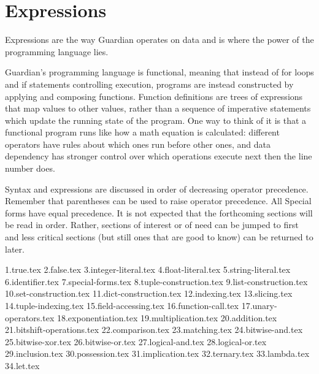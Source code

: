 
\section{Expressions}
{
	Expressions are the way Guardian operates on data and is where the power
	of the programming language lies.
	
	Guardian's programming language is functional, meaning that instead of
	for loops and if statements controlling execution, programs are
	instead constructed by applying and composing functions. Function
	definitions are trees of expressions that map values to other values,
	rather than a sequence of imperative statements which update
	the running state of the program. One way to think of it is that
	a functional program runs like how a math equation is
	calculated: different operators have rules about which ones run before
	other ones, and data dependency has stronger control over which
	operations execute next then the line number does.
	
	Syntax and expressions are discussed in order of decreasing operator
	precedence. Remember that parentheses can be used to raise operator
	precedence. All Special forms have equal precedence.
	It is not expected that the forthcoming sections will be read
	in order. Rather, sections of interest or of need can be jumped to first
	and less critical sections (but still ones that are good to know) can be
	returned to later.
	
	{1.true.tex}
	{2.false.tex}
	{3.integer-literal.tex}
	{4.float-literal.tex}
	{5.string-literal.tex}
	{6.identifier.tex}
	{7.special-forms.tex}
	{8.tuple-construction.tex}
	{9.list-construction.tex}
	{10.set-construction.tex}
	{11.dict-construction.tex}
	{12.indexing.tex}
	{13.slicing.tex}
	{14.tuple-indexing.tex}
	{15.field-accessing.tex}
	{16.function-call.tex}
	{17.unary-operators.tex}
	{18.exponentiation.tex}
	{19.multiplication.tex}
	{20.addition.tex}
	{21.bitshift-operations.tex}
	{22.comparison.tex}
	{23.matching.tex}
	{24.bitwise-and.tex}
	{25.bitwise-xor.tex}
	{26.bitwise-or.tex}
	{27.logical-and.tex}
	{28.logical-or.tex}
	{29.inclusion.tex}
	{30.possession.tex}
	{31.implication.tex}
	{32.ternary.tex}
	{33.lambda.tex}
	{34.let.tex}
}











